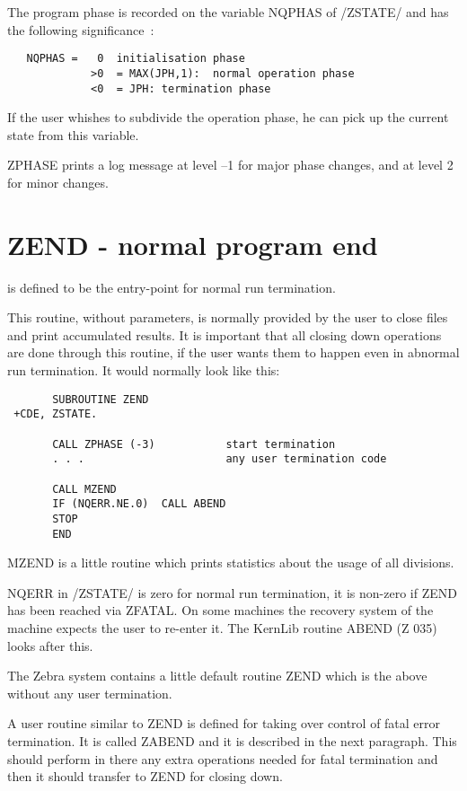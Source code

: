 The program phase is recorded on the variable NQPHAS of /ZSTATE/
and has the following significance~:
\begin{verbatim}
   NQPHAS =   0  initialisation phase
             >0  = MAX(JPH,1):  normal operation phase
             <0  = JPH: termination phase
\end{verbatim} 
If the user whishes to subdivide the operation phase,
he can pick up the current state from this variable.

ZPHASE prints a log message at level --1 for major phase changes,
and at level 2 for minor changes.

\section{ZEND - normal program end}

is defined to be the entry-point for normal run termination.

This routine, without parameters, is normally provided by the user
to close files and print accumulated results.
It is important that all closing down operations are
done through this routine,
if the user wants them to happen even in abnormal
run termination.
It would normally look like this:
\begin{verbatim}
       SUBROUTINE ZEND
 +CDE, ZSTATE.

       CALL ZPHASE (-3)           start termination
       . . .                      any user termination code

       CALL MZEND
       IF (NQERR.NE.0)  CALL ABEND
       STOP
       END
\end{verbatim} 

MZEND is a little routine which prints statistics about
the usage of all divisions.

NQERR in /ZSTATE/ is zero for normal run termination,
it is non-zero if ZEND has been reached via ZFATAL.
On some machines the recovery system of the machine
expects the user to re-enter it.
The KernLib routine ABEND (Z 035) looks after this.

The Zebra system contains a little default routine
ZEND which is the above without any user termination.

A user routine similar to ZEND is defined for taking over control
of fatal error termination. It is called ZABEND and it is
described in the next paragraph.
This should perform in there any extra operations needed
for fatal termination and then it should transfer
to ZEND for closing down.

